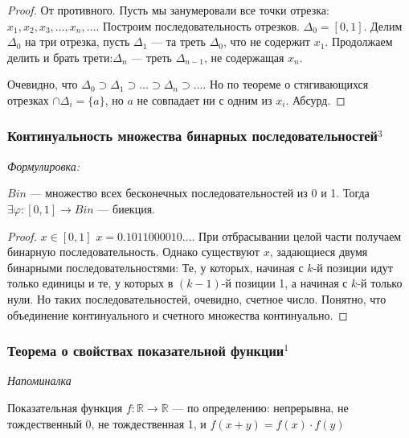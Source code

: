 \documentclass{article}
\begin{document}
\begin{proof}
От противного. Пусть мы занумеровали все точки отрезка:$x_1, x_2, x_3, \ldots, x_n, \ldots$. Построим последовательность отрезков. $\Delta_0 = [0, 1]$. Делим $\Delta_0$ на три отрезка, пусть $\Delta_1$ --- та треть $\Delta_0$, что не содержит $x_1$. Продолжаем делить и брать трети:$\Delta_n$ --- треть $\Delta_{n-1}$, не содержащая $x_n$.

Очевидно, что $\Delta_0 \supset \Delta_1 \supset \ldots \supset \Delta_n \supset\ldots$. Но по теореме о стягивающихся отрезках $\cap \Delta_i = \{a\}$, но $a$ не совпадает ни с одним из $x_i$. Абсурд.
\end{proof}

\subsubsection{Континуальность множества бинарных последовательностей\texorpdfstring{$^3$}{}}
\textit{Формулировка: }

$Bin$ --- множество всех бесконечных последовательностей из 0 и 1. Тогда $\exists \varphi:[0,1] \to Bin$ --- биекция.

\begin{proof}
$x \in [0, 1]$ $x = 0.1011000010\ldots$. При отбрасывании целой части получаем бинарную последовательность. Однако существуют $x$, задающиеся двумя бинарными последовательностями: Те, у которых, начиная с $k$-й позиции идут только единицы и те, у которых в $(k-1)$-й позиции 1, а начиная с $k$-й только нули. Но таких последовательностей, очевидно, счетное число. Понятно, что объединение континуального и счетного множества континуально.
\end{proof}

\subsubsection{Теорема о свойствах показательной функции\texorpdfstring{$^1$}{}}
\textit {Напоминалка}

Показательная функция $f:\mathbb{R}\to\mathbb{R}$ --- по определению: непрерывна, не тождественный 0, не тождественная 1, и $f(x + y) = f(x) \cdot f(y)$
\end{document}
